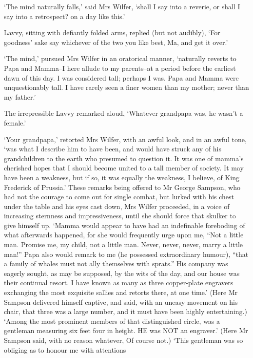 ‘The mind naturally falls,’ said Mrs Wilfer, ‘shall I say into a
reverie, or shall I say into a retrospect? on a day like this.’

Lavvy, sitting with defiantly folded arms, replied (but not audibly),
‘For goodness’ sake say whichever of the two you like best, Ma, and get
it over.’

‘The mind,’ pursued Mrs Wilfer in an oratorical manner, ‘naturally
reverts to Papa and Mamma--I here allude to my parents--at a period
before the earliest dawn of this day. I was considered tall; perhaps I
was. Papa and Mamma were unquestionably tall. I have rarely seen a finer
women than my mother; never than my father.’

The irrepressible Lavvy remarked aloud, ‘Whatever grandpapa was, he
wasn’t a female.’

‘Your grandpapa,’ retorted Mrs Wilfer, with an awful look, and in an
awful tone, ‘was what I describe him to have been, and would have struck
any of his grandchildren to the earth who presumed to question it. It
was one of mamma’s cherished hopes that I should become united to a
tall member of society. It may have been a weakness, but if so, it was
equally the weakness, I believe, of King Frederick of Prussia.’ These
remarks being offered to Mr George Sampson, who had not the courage to
come out for single combat, but lurked with his chest under the table
and his eyes cast down, Mrs Wilfer proceeded, in a voice of increasing
sternness and impressiveness, until she should force that skulker
to give himself up. ‘Mamma would appear to have had an indefinable
foreboding of what afterwards happened, for she would frequently urge
upon me, “Not a little man. Promise me, my child, not a little man.
Never, never, never, marry a little man!” Papa also would remark to me
(he possessed extraordinary humour), “that a family of whales must not
ally themselves with sprats.” His company was eagerly sought, as may
be supposed, by the wits of the day, and our house was their continual
resort. I have known as many as three copper-plate engravers exchanging
the most exquisite sallies and retorts there, at one time.’ (Here Mr
Sampson delivered himself captive, and said, with an uneasy movement on
his chair, that three was a large number, and it must have been highly
entertaining.) ‘Among the most prominent members of that distinguished
circle, was a gentleman measuring six feet four in height. HE was NOT
an engraver.’ (Here Mr Sampson said, with no reason whatever, Of course
not.) ‘This gentleman was so obliging as to honour me with attentions
